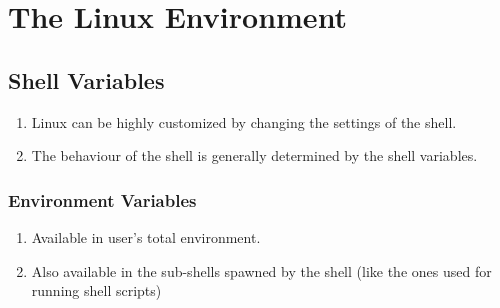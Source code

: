 \documentclass[12pt, a4paper]{report}
\begin{document}
\chapter{The Linux Environment}
\section{Shell Variables}
\begin{enumerate}
\item Linux can be highly customized by changing the settings of the shell.
\item The behaviour of the shell is generally determined by the shell variables.
\end{enumerate}
\subsection{Environment Variables}
\begin{enumerate}
\item Available in user's total environment.
\item Also available in the sub-shells spawned by the shell (like the ones used for running shell scripts)
\end{enumerate}
\end{document}

